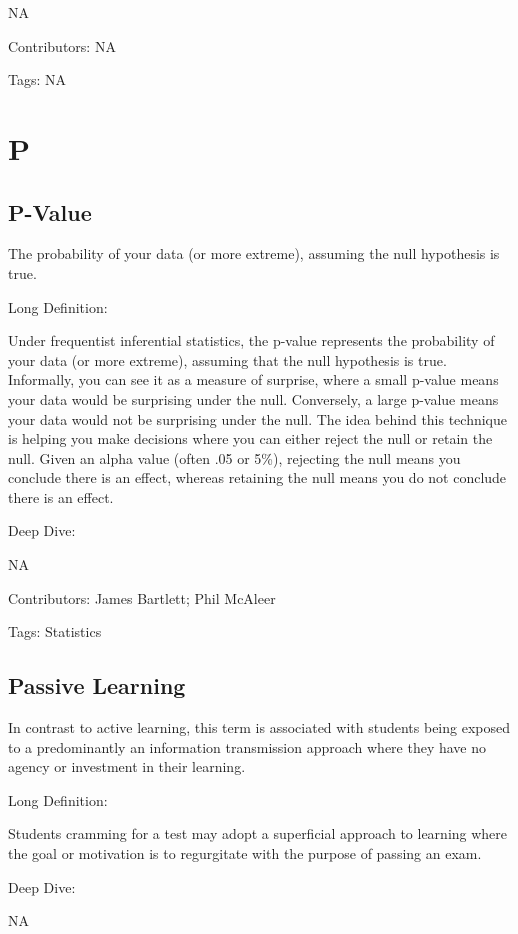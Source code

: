 \documentclass[
  letterpaper,
  DIV=11,
  numbers=noendperiod]{scrreprt}
\begin{document}
NA

Contributors: NA

Tags: NA


\chapter{P}\label{p}

\section{P-Value}\label{p-value}

The probability of your data (or more extreme), assuming the null
hypothesis is true.

Long Definition:

Under frequentist inferential statistics, the p-value represents the
probability of your data (or more extreme), assuming that the null
hypothesis is true. Informally, you can see it as a measure of surprise,
where a small p-value means your data would be surprising under the
null. Conversely, a large p-value means your data would not be
surprising under the null. The idea behind this technique is helping you
make decisions where you can either reject the null or retain the null.
Given an alpha value (often .05 or 5\%), rejecting the null means you
conclude there is an effect, whereas retaining the null means you do not
conclude there is an effect.

Deep Dive:

NA

Contributors: James Bartlett; Phil McAleer

Tags: Statistics

\section{Passive Learning}\label{passive-learning}

In contrast to active learning, this term is associated with students
being exposed to a predominantly an information transmission approach
where they have no agency or investment in their learning.

Long Definition:

Students cramming for a test may adopt a superficial approach to
learning where the goal or motivation is to regurgitate with the purpose
of passing an exam.

Deep Dive:

NA
\end{document}
